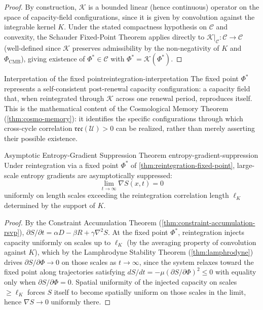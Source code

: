 \documentclass[12pt,twoside,openright]{book}
\newcommand{\reco}{\mathfrak{rec}}
\begin{document}
\begin{proof}
  By construction, $\mathcal{K}$ is a bounded linear
  (hence continuous) operator on the space of capacity-field
  configurations, since it is given by convolution against
  the integrable kernel $K$. Under the stated compactness
  hypothesis on $\mathcal{C}$ and convexity, the
  Schauder Fixed-Point Theorem applies directly to
  $\mathcal{K}|_\mathcal{C} : \mathcal{C}\to\mathcal{C}$
  (well-defined since $\mathcal{K}$ preserves admissibility
  by the non-negativity of $K$ and $\Phi_\mathrm{CMB}$),
  giving existence of $\Phi^*\in\mathcal{C}$ with
  $\Phi^* = \mathcal{K}(\Phi^*)$.
\end{proof}

\begin{remark}{Interpretation of the fixed point}{reintegration-interpretation}
  The fixed point $\Phi^*$ represents a self-consistent
  post-renewal capacity configuration: a capacity field
  that, when reintegrated through $\mathcal{K}$ across one
  renewal period, reproduces itself. This is the
  mathematical content of the Cosmological Memory Theorem
  (\cref{thm:cosmo-memory}): it identifies the specific
  configurations through which cross-cycle correlation
  $\reco(\mathcal{U})>0$ can be realized, rather than merely
  asserting their possible existence.
\end{remark}

\begin{theorem}{Asymptotic Entropy-Gradient Suppression Theorem}%
  {entropy-gradient-suppression}
  Under reintegration via a fixed point $\Phi^*$ of
  \cref{thm:reintegration-fixed-point}, large-scale entropy
  gradients are asymptotically suppressed:
  \[
    \lim_{t\to\infty} \nabla S(x,t) = 0
  \]
  uniformly on length scales exceeding the reintegration
  correlation length $\ell_K$ determined by the support of
  $K$.
\end{theorem}

\begin{proof}
  By the Constraint Accumulation Theorem
  (\cref{thm:constraint-accumulation-rsvp}),
  $\partial S/\partial t = \alpha D - \beta R + \gamma\nabla^2 S$.
  At the fixed point $\Phi^*$, reintegration injects capacity
  uniformly on scales up to $\ell_K$ (by the averaging
  property of convolution against $K$), which by the
  Lamphrodyne Stability Theorem (\cref{thm:lamphrodyne})
  drives $\partial S/\partial\Phi \to 0$ on those scales as
  $t\to\infty$, since the system relaxes toward the fixed
  point along trajectories satisfying
  $dS/dt = -\mu(\partial S/\partial\Phi)^2 \le 0$ with
  equality only when $\partial S/\partial\Phi = 0$. Spatial
  uniformity of the injected capacity on scales $\ge\ell_K$
  forces $S$ itself to become spatially uniform on those
  scales in the limit, hence $\nabla S \to 0$ uniformly
  there.
\end{proof}
\end{document}

